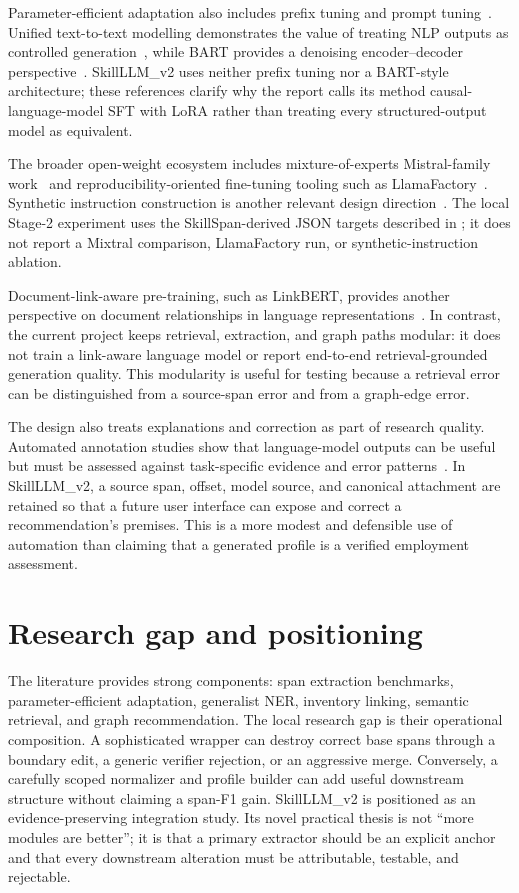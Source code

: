 Parameter-efficient adaptation also includes prefix tuning and prompt tuning~\cite{li2021prefixtuning,lester2021prompttuning}. Unified text-to-text modelling demonstrates the value of treating NLP outputs as controlled generation~\cite{raffel2020t5}, while BART provides a denoising encoder--decoder perspective~\cite{lewis2020bart}. SkillLLM\_v2 uses neither prefix tuning nor a BART-style architecture; these references clarify why the report calls its method causal-language-model SFT with LoRA rather than treating every structured-output model as equivalent.

The broader open-weight ecosystem includes mixture-of-experts Mistral-family work~\cite{jiang2024mixtral} and reproducibility-oriented fine-tuning tooling such as LlamaFactory~\cite{zheng2024llamafactory}. Synthetic instruction construction is another relevant design direction~\cite{wang2023selfinstruct}. The local Stage-2 experiment uses the SkillSpan-derived JSON targets described in ; it does not report a Mixtral comparison, LlamaFactory run, or synthetic-instruction ablation.

Document-link-aware pre-training, such as LinkBERT, provides another perspective on document relationships in language representations~\cite{yasunaga2022linkbert}. In contrast, the current project keeps retrieval, extraction, and graph paths modular: it does not train a link-aware language model or report end-to-end retrieval-grounded generation quality. This modularity is useful for testing because a retrieval error can be distinguished from a source-span error and from a graph-edge error.

The design also treats explanations and correction as part of research quality. Automated annotation studies show that language-model outputs can be useful but must be assessed against task-specific evidence and error patterns~\cite{gilardi2023annotation}. In SkillLLM\_v2, a source span, offset, model source, and canonical attachment are retained so that a future user interface can expose and correct a recommendation's premises. This is a more modest and defensible use of automation than claiming that a generated profile is a verified employment assessment.

\section{Research gap and positioning}

The literature provides strong components: span extraction benchmarks, parameter-efficient adaptation, generalist NER, inventory linking, semantic retrieval, and graph recommendation. The local research gap is their operational composition. A sophisticated wrapper can destroy correct base spans through a boundary edit, a generic verifier rejection, or an aggressive merge. Conversely, a carefully scoped normalizer and profile builder can add useful downstream structure without claiming a span-F1 gain. SkillLLM\_v2 is positioned as an evidence-preserving integration study. Its novel practical thesis is not ``more modules are better''; it is that a primary extractor should be an explicit anchor and that every downstream alteration must be attributable, testable, and rejectable.
